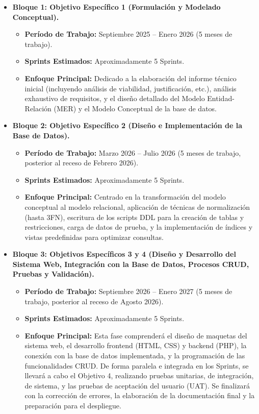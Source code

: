 \begin{itemize}
    \item \textbf{Bloque 1: Objetivo Específico 1 (Formulación y Modelado Conceptual).}
    \begin{itemize}
        \item \textbf{Período de Trabajo:} Septiembre 2025 – Enero 2026 (5 meses de trabajo).
        \item \textbf{Sprints Estimados:} Aproximadamente 5 Sprints.
        \item \textbf{Enfoque Principal:} Dedicado a la elaboración del informe técnico inicial (incluyendo análisis de viabilidad, justificación, etc.), análisis exhaustivo de requisitos, y el diseño detallado del Modelo Entidad-Relación (MER) y el Modelo Conceptual de la base de datos.
    \end{itemize}

    \item \textbf{Bloque 2: Objetivo Específico 2 (Diseño e Implementación de la Base de Datos).}
    \begin{itemize}
        \item \textbf{Período de Trabajo:} Marzo 2026 – Julio 2026 (5 meses de trabajo, posterior al receso de Febrero 2026).
        \item \textbf{Sprints Estimados:} Aproximadamente 5 Sprints.
        \item \textbf{Enfoque Principal:} Centrado en la transformación del modelo conceptual al modelo relacional, aplicación de técnicas de normalización (hasta 3FN), escritura de los scripts DDL para la creación de tablas y restricciones, carga de datos de prueba, y la implementación de índices y vistas predefinidas para optimizar consultas.
    \end{itemize}

    \item \textbf{Bloque 3: Objetivos Específicos 3 y 4 (Diseño y Desarrollo del Sistema Web, Integración con la Base de Datos, Procesos CRUD, Pruebas y Validación).}
    \begin{itemize}
        \item \textbf{Período de Trabajo:} Septiembre 2026 – Enero 2027 (5 meses de trabajo, posterior al receso de Agosto 2026).
        \item \textbf{Sprints Estimados:} Aproximadamente 5 Sprints.
        \item \textbf{Enfoque Principal:} Esta fase comprenderá el diseño de maquetas del sistema web, el desarrollo frontend (HTML, CSS) y backend (PHP), la conexión con la base de datos implementada, y la programación de las funcionalidades CRUD. De forma paralela e integrada en los Sprints, se llevará a cabo el Objetivo 4, realizando pruebas unitarias, de integración, de sistema, y las pruebas de aceptación del usuario (UAT). Se finalizará con la corrección de errores, la elaboración de la documentación final y la preparación para el despliegue.
    \end{itemize}
\end{itemize}

